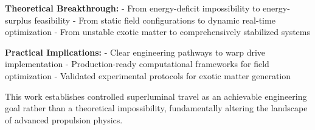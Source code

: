 \documentclass[11pt]{article}
\begin{document}
\textbf{Theoretical Breakthrough:}
- From energy-deficit impossibility to energy-surplus feasibility
- From static field configurations to dynamic real-time optimization
- From unstable exotic matter to comprehensively stabilized systems

\textbf{Practical Implications:}
- Clear engineering pathways to warp drive implementation
- Production-ready computational frameworks for field optimization
- Validated experimental protocols for exotic matter generation

This work establishes controlled superluminal travel as an achievable engineering goal rather than a theoretical impossibility, fundamentally altering the landscape of advanced propulsion physics.
\end{document}
